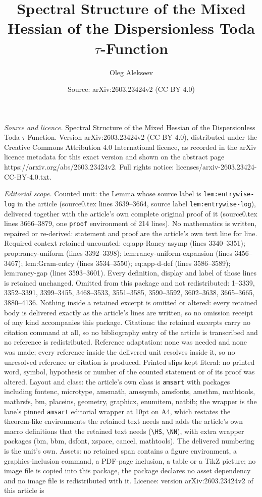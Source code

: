 \documentclass[10pt,a4paper]{amsart}
\title[Spectral Structure of the Mixed Hessian of the Dispersionles]{Spectral Structure of the Mixed Hessian of the Dispersionless Toda $\tau$-Function}
\author{Oleg Alekseev}
\date{Source: arXiv:2603.23424v2 (CC BY 4.0)}
\begin{document}
\maketitle

\noindent\emph{Source and licence.} Spectral Structure of the Mixed Hessian of the Dispersionless Toda $\tau$-Function. Version arXiv:2603.23424v2 (CC BY 4.0), distributed under the Creative Commons Attribution 4.0 International licence, as recorded in the arXiv licence metadata for this exact version and shown on the abstract page https://arxiv.org/abs/2603.23424v2. Full rights notice: licenses/arxiv-2603.23424-CC-BY-4.0.txt.\par\smallskip

\noindent\textit{Editorial scope.} Counted unit: the Lemma whose source label is \texttt{lem:entrywise-log} in the article (source0.tex lines 3639--3664, source label \texttt{lem:entrywise-log}), delivered together with the article's own complete original proof of it (source0.tex lines 3666--3879, one \texttt{proof} environment of 214 lines). No mathematics is written, repaired or re-derived: statement and proof are the article's own text line for line. Required context retained uncounted: eq:app-Raney-asymp (lines 3340--3351); prop:raney-uniform (lines 3392--3398); lem:raney-uniform-expansion (lines 3456--3467); lem:Gram-entry (lines 3534--3550); eq:app-d-def (lines 3586--3589); lem:raney-gap (lines 3593--3601). Every definition, display and label of those lines is retained unchanged. Omitted from this package and not redistributed: 1--3339, 3352--3391, 3399--3455, 3468--3533, 3551--3585, 3590--3592, 3602--3638, 3665--3665, 3880--4136. Nothing inside a retained excerpt is omitted or altered: every retained body is delivered exactly as the article's lines are written, so no omission receipt of any kind accompanies this package. Citations: the retained excerpts carry no citation command at all, so no bibliography entry of the article is transcribed and no reference is redistributed. Reference adaptation: none was needed and none was made; every reference inside the delivered unit resolves inside it, so no unresolved reference or citation is produced. Printed slips kept literal: no printed word, symbol, hypothesis or number of the counted statement or of its proof was altered. Layout and class: the article's own class is \texttt{amsart} with packages including fontenc, microtype, amsmath, amssymb, amsfonts, amsthm, mathtools, mathrsfs, bm, placeins, geometry, graphicx, enumitem, natbib; the wrapper is the lane's pinned \texttt{amsart} editorial wrapper at 10pt on A4, which restates the theorem-like environments the retained text needs and adds the article's own macro definitions that the retained text needs (\texttt{\textbackslash HS}, \texttt{\textbackslash NN}), with extra wrapper packages (bm, bbm, dsfont, xspace, cancel, mathtools). The delivered numbering is the unit's own. Assets: no retained span contains a figure environment, a graphics-inclusion command, a PDF-page inclusion, a table or a TikZ picture; no image file is copied into this package, the package declares no asset dependency and no image file is redistributed with it. Licence: version arXiv:2603.23424v2 of this article is 
\end{document}
